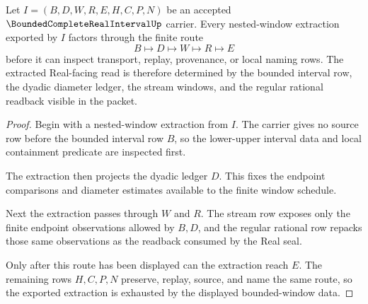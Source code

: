 \begin{theorem}
\label{thm:bounded-complete-real-interval-nested-interval-extraction}
Let $I=(B,D,W,R,E,H,C,P,N)$ be an accepted $\BoundedCompleteRealIntervalUp$ carrier. Every nested-window extraction exported by $I$ factors through the finite route
$$
B\longmapsto D\longmapsto W\longmapsto R\longmapsto E
$$
before it can inspect transport, replay, provenance, or local naming rows. The extracted Real-facing read is therefore determined by the bounded interval row, the dyadic diameter ledger, the stream windows, and the regular rational readback visible in the packet.
\end{theorem}
\begin{proof}
Begin with a nested-window extraction from $I$. The carrier gives no source row before the bounded interval row $B$, so the lower-upper interval data and local containment predicate are inspected first.

The extraction then projects the dyadic ledger $D$. This fixes the endpoint comparisons and diameter estimates available to the finite window schedule.

Next the extraction passes through $W$ and $R$. The stream row exposes only the finite endpoint observations allowed by $B,D$, and the regular rational row repacks those same observations as the readback consumed by the Real seal.

Only after this route has been displayed can the extraction reach $E$. The remaining rows $H,C,P,N$ preserve, replay, source, and name the same route, so the exported extraction is exhausted by the displayed bounded-window data.
\end{proof}


\begin{closurestatus}{\BoundedCompleteRealIntervalUp}
  \theoryclosure{\seedClosure}
  \formalstatus{\unformalizedV}
\end{closurestatus}
